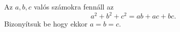    Az $a,b,c$ valós számokra fennáll az
   $$
      a^{2}+b^{2}+c^{2} = ab+ac+bc .
   $$
   Bizonyítsuk be hogy ekkor $a=b=c$.
